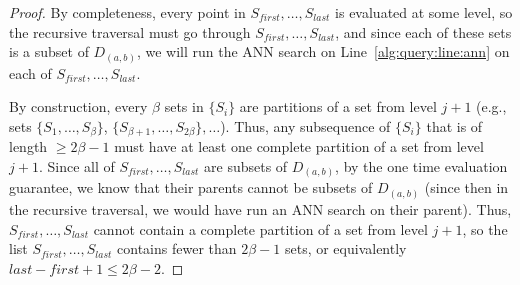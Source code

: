 \documentclass{article}
\theoremstyle{plain}
\theoremstyle{definition}
\theoremstyle{remark}
\newcommand{\julian}[1]{{\color{red}{\bf Julian:} #1}}
\begin{document}
\begin{proof}
By completeness, every point in $S_{first}, \ldots, S_{last}$ is evaluated at some level, so the recursive traversal must go through $S_{first}, \ldots, S_{last}$, and since each of these sets is a subset of $D_{(a, b)}$, we will run the ANN search on Line~\ref{alg:query:line:ann} on each of $S_{first}, \ldots, S_{last}$. 

By construction, every $\beta$ sets in $\{S_i\}$ are partitions of a set from level $j + 1$ (e.g., sets $\{S_1, \ldots, S_\beta\}$, $\{S_{\beta + 1}, \ldots, S_{2\beta}\}, \ldots$). Thus, any subsequence of $\{S_i\}$ that is of length  $\ge 2\beta - 1$ must have at least one complete partition of a set from level $j + 1$. Since all of $S_{first}, \ldots, S_{last}$ are subsets of $D_{(a,b)}$, by the one time evaluation guarantee, we know that their parents cannot be subsets of $D_{(a, b)}$ (since then in the recursive traversal, we would have run an ANN search on their parent). Thus, $S_{first}, \ldots, S_{last}$ cannot contain a complete partition of a set from level $j + 1$, so the list $S_{first}, \ldots, S_{last}$ contains fewer than $2\beta - 1$ sets, or equivalently $last - first + 1 \le 2\beta - 2$.



\end{proof}
\end{document}
